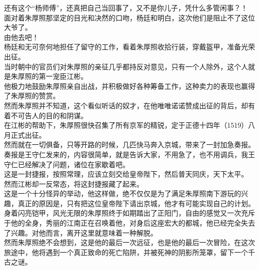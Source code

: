 \begin{multicols}{\theparacolNo}
还有这个“杨师傅”，还真把自己当回事了，又不是你儿子，凭什么多管闲事？！\\

面对着朱厚照那坚定的目光和决然的口吻，杨廷和明白，这次他们是阻止不了这位大爷了。\\

由他去吧！\\

杨廷和无可奈何地担任了留守的工作，看着朱厚照收拾行装，穿戴盔甲，准备光荣出征。\\

当时朝中的官员们对朱厚照的亲征几乎都持反对意见，只有一个人除外，这个人就是朱厚照的第一宠臣江彬。\\

他极力地鼓励朱厚照亲自出战，并积极做好各种筹备工作，这种卖力的表现也赢得了朱厚照的赞赏。\\

然而朱厚照并不知道，这个看似听话的奴才，在他唯唯诺诺赞成出征的背后，却有着不可告人的目的和阴谋。\\

在江彬的帮助下，朱厚照很快召集了所有京军的精锐，定于正德十四年（1519）八月正式出征。\\

然而就在一切俱备，只等开路的时候，几匹快马奔入京城，带来了一封加急奏报。\\

奏报是王守仁发来的，内容很简单，就是告诉大家，不用急了，也不用调兵，我王守仁已经解决了问题，诸位在家歇着吧。\\

这是一封捷报，按照常理，应该立刻交给皇帝陛下，然后普天同庆，天下太平。\\

然而江彬却一反常态，将这封捷报藏了起来。\\

这是一个十分怪异的举动，他这样做，绝不仅仅是为了满足朱厚照南下游玩的兴趣，真正的原因是，只有把这位皇帝陛下请出京城，他才有可能实现自己的计划。\\

身着闪亮铠甲，风光无限的朱厚照终于如期踏出了正阳门，自由的感觉又一次充斥于他的全身，秀丽的江南正在召唤着他，对身后这座宏大的都城，他已经完全失去了兴趣。对他而言，离开这里就意味着一种解脱。\\

然而朱厚照绝不会想到，这是他的最后一次远征，也是他的最后一次冒险，在这次旅途中，他将遇到一个真正致命的死亡陷阱，并被死神的阴影所笼罩，留下一个千古之谜。\\


\end{multicols}
